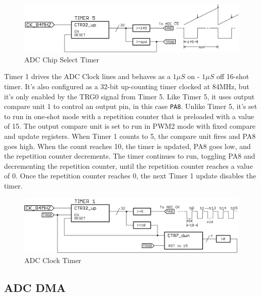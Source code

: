 \documentclass[11pt,twoside]{mitthesis}
\begin{document}
\begin{figure}[H]
  \begin{center}
      \includegraphics[width=1\textwidth]{../tim5.png}
      \caption{ADC Chip Select Timer}
  \end{center}
\end{figure}

Timer 1 drives the ADC Clock lines and behaves as a $1\mu S$ on - $1\mu S$ off 16-shot timer.
It's also configured as a 32-bit up-counting timer clocked at 84MHz, but it's only enabled by the TRG0 signal from Timer 5.
Like Timer 5, it uses output compare unit 1 to control an output pin, in this case \texttt{PA8}.
Unlike Timer 5, it's set to run in one-shot mode with a repetition counter that is preloaded with a value of 15.
The output compare unit is set to run in PWM2 mode with fixed compare and update registers.
When Timer 1 counts to 5, the compare unit fires and PA8 goes high.
When the count reaches 10, the timer is updated, PA8 goes low, and the repetition counter decrements.
The timer continues to run, toggling PA8 and decrementing the repetition counter, until the repetition counter reaches a value of 0.
Once the repetition counter reaches 0, the next Timer 1 update disables the timer.



\begin{figure}[h!]
  \begin{center}
      \includegraphics[width=1\textwidth]{../tim1.png}
      \caption{ADC Clock Timer}
  \end{center}
\end{figure}


\subsection{ADC DMA}
\end{document}

